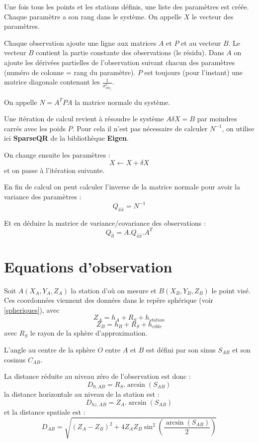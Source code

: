 \documentclass[french]{report}
\begin{document}
Une fois tous les points et les stations définis, une liste des paramètres est créée.
Chaque paramètre a son rang dans le système. On appelle $X$ le vecteur des paramètres.

Chaque observation ajoute une ligne aux matrices $A$ et $P$ et au vecteur $B$.
Le vecteur $B$ contient la partie constante des observations (le résidu).
Dans $A$ on ajoute les dérivées partielles de l'observation suivant chacun des paramètres (numéro de colonne = rang du paramètre).
$P$ est toujours (pour l'instant) une matrice diagonale contenant les $\frac{1}{\sigma_{obs_i}^2}$.

On appelle $ N = A^T P A $ la matrice normale du système.

Une itération de calcul revient à résoudre le système $ A \delta X = B $ par moindres carrés avec les poids $P$.
Pour cela il n'est pas nécessaire de calculer $ N^{-1} $, on utilise ici
\textbf{SparseQR} de la bibliothèque \textbf{Eigen}.

On change ensuite les paramètres : $$ X \leftarrow X + \delta X$$
et on passe à l'itération suivante.

En fin de calcul on peut calculer l'inverse de la matrice normale pour avoir la variance des paramètres :
$$ Q_{\hat{x}\hat{x}} = N^{-1} $$

Et en déduire la matrice de variance/covariance des observations :
$$ Q_{\hat{l}\hat{l}} = A . Q_{\hat{x}\hat{x}} . A^T $$



\chapter{Equations d'observation}



Soit $A(X_A,Y_A,Z_A)$ la station d'où on mesure et $B(X_B,Y_B,Z_B)$ le point visé.
Ces coordonnées viennent des données dans le repère sphérique (voir \ref{spheriques}),
avec
$$Z_A = h_A + R_S + h_{station}$$
$$Z_B = h_B + R_S + h_{cible}$$
avec $R_S$ le rayon de la sphère d'approximation.

L'angle au centre de la sphère $O$ entre $A$ et $B$ est
défini par son sinus $S_{AB}$ et son cosinus $C_{AB}$.

La distance réduite au niveau zéro de l'observation est donc :
$$ D_{0,AB} = R_S . \arcsin(S_{AB})$$
la distance horizontale au niveau de la station est :
$$ D_{hz,AB} = Z_A . \arcsin(S_{AB})$$
 et la distance spatiale est :
$$D_{AB} = \sqrt{(Z_A-Z_B)^2+4 Z_A Z_B \sin^2 \left( \frac{\arcsin(S_{AB})}{2} \right) }$$
\end{document}
